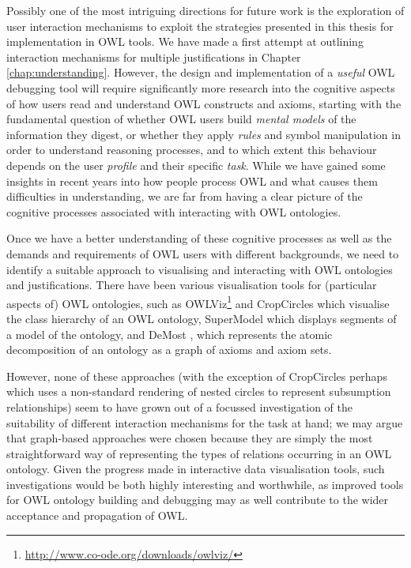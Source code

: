 Possibly one of the most intriguing directions for future work is the exploration of user interaction mechanisms to exploit the strategies presented in this thesis for implementation in OWL tools. We have made a first attempt at outlining interaction mechanisms for multiple justifications in Chapter \ref{chap:understanding}. However, the design and implementation of a \emph{useful} OWL debugging tool will require significantly more research into the cognitive aspects of how users read and understand OWL constructs and axioms, starting with the fundamental question of whether OWL users build \emph{mental models} \cite{johnson-laird80kt} of the information they digest, or whether they apply \emph{rules} and symbol manipulation in order to understand reasoning processes, and to which extent this behaviour depends on the user \emph{profile} and their specific \emph{task}. While we have gained some insights in recent years into how people process OWL and what causes them difficulties in understanding, we are far from having a clear picture of the cognitive processes associated with interacting with OWL ontologies.

Once we have a better understanding of these cognitive processes as well as the demands and requirements of OWL users with different backgrounds, we need to identify a suitable approach to visualising and interacting with OWL ontologies and justifications. There have been various visualisation tools for (particular aspects of) OWL ontologies, such as OWLViz\footnote{\url{http://www.co-ode.org/downloads/owlviz/}} and CropCircles \cite{wang06wr} which visualise the class hierarchy of an OWL ontology, SuperModel \cite{bauer09ru} which displays segments of a model of the ontology, and DeMost \cite{del-vescovo11aa}, which represents the atomic decomposition of an ontology as a graph of axioms and axiom sets. 

However, none of these approaches (with the exception of CropCircles perhaps which uses a non-standard rendering of nested circles to represent subsumption relationships) seem to have grown out of a focussed investigation of the suitability of different interaction mechanisms for the task at hand; we may argue that graph-based approaches were chosen because they are simply the most straightforward way of representing the types of relations occurring in an OWL ontology. Given the progress made in interactive data visualisation tools, such investigations would be both highly interesting and worthwhile, as improved tools for OWL ontology building and debugging may as well contribute to the wider acceptance and propagation of OWL.


